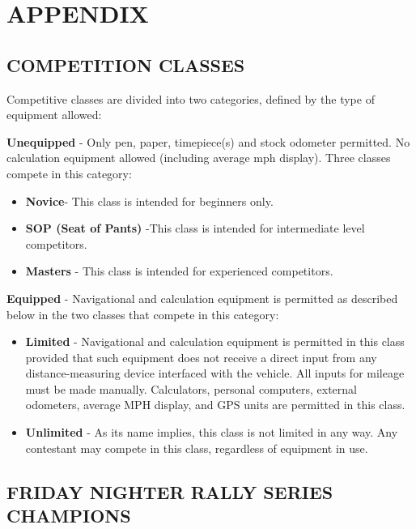 \section{APPENDIX}
\subsection{COMPETITION CLASSES}
Competitive classes are divided into two categories, defined by the
type of equipment allowed:

\textbf{Unequipped} - Only pen, paper, timepiece(s) and stock odometer permitted. No calculation equipment allowed (including average mph display). Three classes compete in this category:
\begin{itemize}
\item \textbf{Novice}- This class is intended for beginners only.
\item \textbf{SOP (Seat of Pants)} -This class is intended for intermediate level competitors.
\item \textbf{Masters} - This class is intended for experienced competitors.
\end{itemize}

\textbf{Equipped} - Navigational and calculation equipment is permitted as described below in the two classes that compete in this category:
\begin{itemize}
\item \textbf{Limited} - Navigational and calculation equipment is permitted in this class provided that such equipment does not receive a direct input from any distance-measuring device interfaced with the
vehicle. All inputs for mileage must be made manually. Calculators, personal computers, external odometers, average MPH display, and GPS units are permitted in this class.

\item \textbf{Unlimited} - As its name implies, this class is not limited in any way. Any contestant may compete in this class, regardless of equipment in use.
\end{itemize}

\subsection{FRIDAY NIGHTER RALLY SERIES CHAMPIONS}

